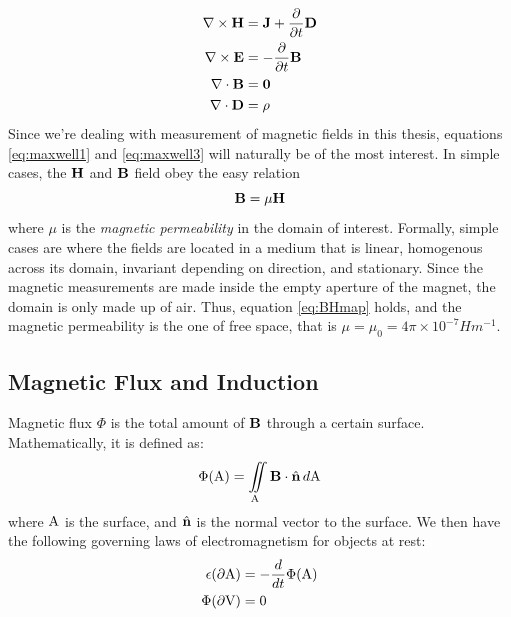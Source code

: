 \begin{align}
    \nabla \times \vb{H} & = \vb{J} + \frac{\partial}{\partial t}\vb{D}
    \label{eq:maxwell1}                                                 \\
    \nabla \times \vb{E} & = -\frac{\partial}{\partial t}\vb{B}
    \label{eq:maxwell2}                                                 \\
    \nabla \cdot \vb{B}  & = \vb{0}
    \label{eq:maxwell3}                                                 \\
    \nabla \cdot \vb{D}  & = \rho
    \label{:eqmaxwell4}
\end{align}
Since we're dealing with measurement of magnetic fields in this thesis,
equations \ref{eq:maxwell1} and \ref{eq:maxwell3} will naturally be of
the most interest. In simple cases, the $\vb{H}$ and $\vb{B}$ field
obey the easy relation
\begin{equation}
    \vb{B} = \mu \vb{H}
    \label{eq:BHmap}
\end{equation}
where $\mu$ is the \emph{magnetic permeability} in the domain of interest.
Formally, simple cases are where the fields are located in a medium that is
linear, homogenous across its domain, invariant depending on direction, and
stationary. Since the magnetic measurements are made inside the empty aperture
of the magnet, the domain is only made up of air. Thus, equation \ref{eq:BHmap}
holds, and the magnetic permeability is the one of free space, that is
$\mu = \mu_0 = 4\pi \times 10^{-7} Hm^{-1}$. \cite[Ch.4.1-4.4]{russenschuck2011field}


\subsection{Magnetic Flux and Induction}
Magnetic flux $\Phi$ is the total amount of $\vb{B}$ through a certain surface.
Mathematically, it is defined as:
\begin{equation}
    \Phi(\mathrm{A}) = \iint\limits_{\mathrm{A}} \vb{B} \cdot \hat{\vb{n}}\, d\mathrm{A}
\end{equation}
where $\mathrm{A}$ is the surface, and $\hat{\vb{n}}$ is the normal vector to the surface.
We then have the following governing laws of electromagnetism for objects at rest:
\begin{align}
    \epsilon(\partial\mathrm{A}) & = -\frac{d}{dt}\Phi(\mathrm{A})
    \label{eq:faraday}                                   \\
    \Phi(\partial\mathrm{V})   & = 0
    \label{eq:fluxcons}
\end{align}

